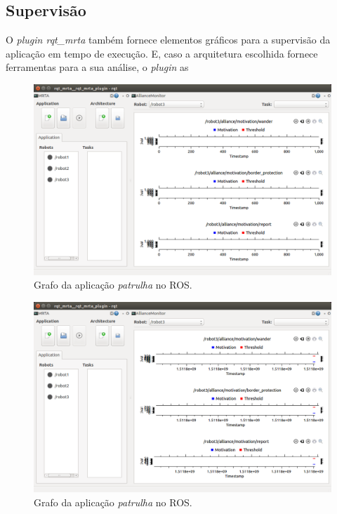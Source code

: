         \subsection{Supervisão}
            O \textit{plugin rqt\_mrta} também fornece elementos gráficos para a supervisão da aplicação em tempo de execução. E, caso a arquitetura escolhida fornece ferramentas para a sua análise, o \textit{plugin} as 
        
            \begin{figure}[p]
                \centering
                \includegraphics[width=.75\textwidth]{Figuras/4_resultados/rqt_mrta1.png}
                \caption{Grafo da aplicação \textit{patrulha} no ROS.} \label{fig:rqt_mrta1}
            \end{figure}
        
            \begin{figure}[p]
                \centering
                \includegraphics[width=.75\textwidth]{Figuras/4_resultados/rqt_mrta2.png}
                \caption{Grafo da aplicação \textit{patrulha} no ROS.} \label{fig:rqt_mrta2}
            \end{figure}
        
